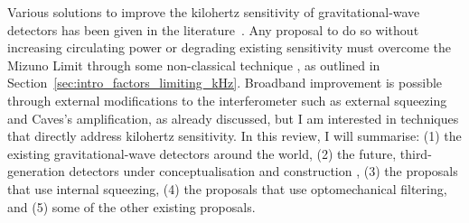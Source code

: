 
Various solutions to improve the kilohertz sensitivity of gravitational-wave detectors has been given in the literature~\cite{}. Any proposal to do so without increasing circulating power or degrading existing sensitivity must overcome the Mizuno Limit through some non-classical technique , as outlined in Section~\ref{sec:intro_factors_limiting_kHz}. Broadband improvement is possible through external modifications to the interferometer such as external squeezing and Caves's amplification, as already discussed, but I am interested in techniques that directly address kilohertz sensitivity. In this review, I will summarise: (1) the existing gravitational-wave detectors around the world, (2) the future, third-generation detectors under conceptualisation and construction , (3) the proposals that use internal squeezing, (4) the proposals that use optomechanical filtering, and (5) some of the other existing proposals. %

